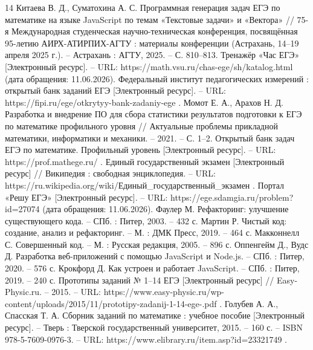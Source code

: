 \begin{thebibliography}{14}
	 Китаева В. Д., Суматохина А. С. Программная генерация задач ЕГЭ по математике на языке JavaScript по темам «Текстовые задачи» и «Вектора» // 75-я Международная студенческая научно-техническая конференция, посвящённая 95-летию АИРХ-АТИРПИХ-АГТУ : материалы конференции (Астрахань, 14–19 апреля 2025 г.). – Астрахань : АГТУ, 2025. – С. 810–813.	
	 Тренажёр «Час ЕГЭ» [Электронный ресурс]. – URL: https://math.vsu.ru/chas-ege/sh/katalog.html (дата обращения: 11.06.2026).
	 Федеральный институт педагогических измерений : открытый банк заданий ЕГЭ [Электронный ресурс]. – URL: https://fipi.ru/ege/otkrytyy-bank-zadaniy-ege .
	 Момот Е. А., Арахов Н. Д. Разработка и внедрение ПО для сбора статистики результатов подготовки к ЕГЭ по математике профильного уровня // Актуальные проблемы прикладной математики, информатики и механики. – 2021. – С. 1–2.
	 Открытый банк задач ЕГЭ по математике. Профильный уровень [Электронный ресурс]. – URL: https://prof.mathege.ru/ .
	 Единый государственный экзамен [Электронный ресурс] // Википедия : свободная энциклопедия. – URL: https://ru.wikipedia.org/wiki/Единый\_государственный\_экзамен .
	 Портал «Решу ЕГЭ» [Электронный ресурс]. – URL: https://ege.sdamgia.ru/problem?id=27074 (дата обращения: 11.06.2026).
	 Фаулер М. Рефакторинг: улучшение существующего кода. – СПб. : Питер, 2003. – 432 с.
	 Мартин Р. Чистый код: создание, анализ и рефакторинг. – М. : ДМК Пресс, 2019. – 464 с.
	 Макконнелл С. Совершенный код. – М. : Русская редакция, 2005. – 896 с.
	 Оппенгейм Д., Вудс Д. Разработка веб-приложений с помощью JavaScript и Node.js. – СПб. : Питер, 2020. – 576 с.
	 Крокфорд Д. Как устроен и работает JavaScript. – СПб. : Питер, 2019. – 240 с.
	 Прототипы заданий № 1–14 ЕГЭ [Электронный ресурс] // Easy-Physic.ru. – 2015. – URL: https://www.easy-physic.ru/wp-content/uploads/2015/11/prototipy-zadanij-1-14-ege-.pdf .
	 Голубев А. А., Спасская Т. А. Сборник заданий по математике : учебное пособие [Электронный ресурс]. – Тверь : Тверской государственный университет, 2015. – 160 с. – ISBN 978-5-7609-0976-3. – URL: https://www.elibrary.ru/item.asp?id=23321749 .
\end{thebibliography}